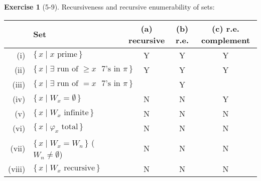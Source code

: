 \documentclass[letterpaper]{article}
\theoremstyle{definition}
\newtheorem*{exer}{Exercise}
\theoremstyle{remark}
\theoremstyle{direction}
\begin{document}
\begin{exer}[5-9]
Recursiveness and recursive enumerability of sets:
\begin{center}
\begin{tabular}{|rl|c|c|c|}
\hline
&\textbf{Set}&\textbf{(a) recursive}&\textbf{(b) r.e.}&\textbf{(c) r.e. complement}\\
\hline
(i)&$\{\,x\mid x\text{ prime}\,\}$&Y&Y&Y\\
(ii)&$\{\,x\mid\exists\text{ run of }\ge x\text{ }7\text{'s in }\pi\,\}$&Y&Y&Y\\
(iii)&$\{\,x\mid\exists\text{ run of }=x\text{ }7\text{'s in }\pi\,\}$&&Y&\\
(iv)&$\{\,x\mid W_x=\emptyset\,\}$&N&N&Y\\
(v)&$\{\,x\mid W_x\text{ infinite}\,\}$&N&N&N\\
(vi)&$\{\,x\mid\varphi_x\text{ total}\,\}$&N&N&N\\
(vii)&$\{\,x\mid W_x=W_n\,\}$ ($W_n\ne\emptyset$)&N&N&N\\
(viii)&$\{\,x\mid W_x\text{ recursive}\,\}$&N&N&N\\
\hline
\end{tabular}
\end{center}
\end{exer}
\end{document}
